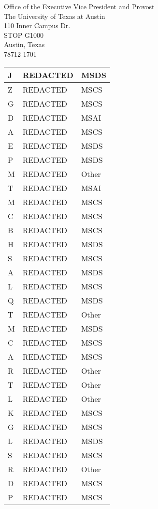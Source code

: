 \documentclass[11pt]{letter}
\begin{document}
\begin{letter}{Office of the Executive Vice President and Provost \\ The University of Texas at Austin \\ 110 Inner Campus Dr. \\ STOP G1000 \\ Austin, Texas \\ 78712-1701}
\begin{tabular}{|p{5cm}|p{6.7cm}|p{2.25cm}|}
        J & REDACTED & MSDS \\ \hline
        Z & REDACTED & MSCS \\ \hline
        G & REDACTED & MSCS \\ \hline
        D & REDACTED & MSAI \\ \hline
        A & REDACTED & MSCS \\ \hline
        E & REDACTED & MSDS \\ \hline
        P & REDACTED & MSDS \\ \hline
        M & REDACTED & Other \\ \hline
        T & REDACTED & MSAI \\ \hline
        M & REDACTED & MSCS \\ \hline
        C & REDACTED & MSCS \\ \hline
        B & REDACTED & MSCS \\ \hline
        H & REDACTED & MSDS \\ \hline
        S & REDACTED & MSCS \\ \hline
        A & REDACTED & MSDS \\ \hline
        L & REDACTED & MSCS \\ \hline
        Q & REDACTED & MSDS \\ \hline
        T & REDACTED & Other  \\ \hline
        M & REDACTED & MSDS \\ \hline
        C & REDACTED & MSCS \\ \hline
        A & REDACTED & MSCS \\ \hline
        R & REDACTED & Other \\ \hline
        T & REDACTED & Other \\ \hline
        L & REDACTED & Other \\ \hline
        K & REDACTED & MSCS \\ \hline
        G & REDACTED & MSCS \\ \hline
        L & REDACTED & MSDS \\ \hline
        S & REDACTED & MSCS \\ \hline
        R & REDACTED & Other \\ \hline
        D & REDACTED & MSCS \\ \hline
        P & REDACTED & MSCS \\ \hline
    \end{tabular}
    \centering
    \begin{tabular}{|p{5cm}|p{6.7cm}|p{2.25cm}|}
        \hline

\end{tabular}
\end{letter}
\end{document}
